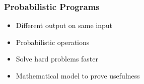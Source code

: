 \begin{frame}
	\frametitle{Probabilistic Programs}
	\begin{itemize}
		\itemspacing{20pt}
		\item Different output on same input
		\item Probabilistic operations
		\item Solve hard problems faster
		\item Mathematical model to prove usefulness
	\end{itemize}
\end{frame}
